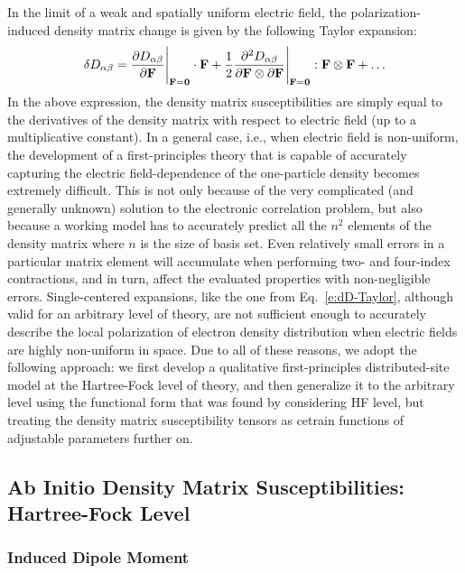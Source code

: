 \documentclass[aip,amsmath,amssymb,reprint,floatfix]{revtex4-1}
\begin{document}
In the limit of a weak and spatially uniform electric field,
the polarization\hyp{}induced density matrix change is given by the following Taylor expansion:
%
\begin{equation}\label{e:dD-Taylor}
 \delta D_{\alpha\beta} = \frac{\partial D_{\alpha\beta}}{\partial {\bf F}}\Bigg|_{{\bf F}={\bf 0}}  \cdot {\bf F} 
   + \frac{1}{2} 
     \frac{\partial^2 D_{\alpha\beta}}{\partial {\bf F} \otimes \partial {\bf F}}\Bigg|_{{\bf F}={\bf 0}} : {\bf F} \otimes {\bf F}
   + \ldots 
\end{equation}
%
In the above expression, the density matrix susceptibilities are simply equal to the derivatives of the density matrix
with respect to electric field (up to a multiplicative constant).
In a general case, i.e., when electric field is non\hyp{}uniform, the development of a first\hyp{}principles theory
that is capable of accurately capturing the electric field\hyp{}dependence of the one\hyp{}particle density
becomes extremely difficult. This is not only because of the very complicated (and generally unknown) solution
to the electronic correlation problem, but also because
a working model has to accurately predict all the $n^2$ elements of the density matrix
where $n$ is the size of basis set. Even relatively small errors
in a particular matrix element will accumulate when performing two\hyp{}
and four\hyp{}index contractions,
and in turn, affect the evaluated properties with non\hyp{}negligible errors.
Single\hyp{}centered expansions, like the one from Eq.~\eqref{e:dD-Taylor}, although valid for 
an arbitrary level of theory,
are not sufficient enough to accurately describe the local polarization
of electron density distribution when electric fields are highly non\hyp{}uniform in space.
Due to all of these reasons, we adopt the following approach: 
we first develop a qualitative first\hyp{}principles distributed\hyp{}site model at the Hartree\hyp{}Fock
level of theory, and then generalize it to the arbitrary level using the functional form that was found 
by considering HF level,
but treating the density matrix susceptibility tensors as cetrain functions of adjustable parameters further on.

\subsection{Ab Initio Density Matrix Susceptibilities: Hartree-Fock Level}

\subsubsection{Induced Dipole Moment}
\end{document}
